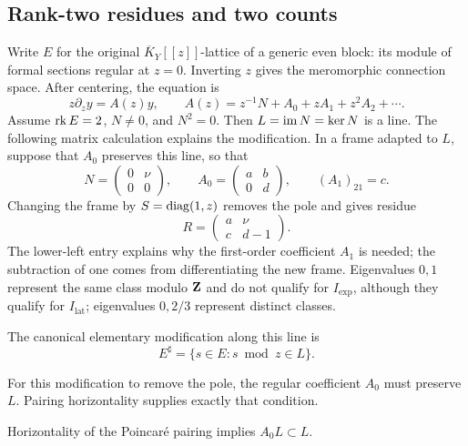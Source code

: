 \subsection{Rank-two residues and two counts}

Write \(E\) for the original \(\overline K_Y[[z]]\)-lattice of a generic
even block: its module of formal sections regular at \(z=0\). Inverting
\(z\) gives the meromorphic connection space. After centering, the equation is
\begin{equation}
 z\partial_z y=A(z)y,
 \qquad A(z)=z^{-1}N+A_0+zA_1+z^2A_2+\cdots.
 \label{eq:atomic-block-expansion}
\end{equation}
Assume \(\operatorname{rk} E=2\), \(N\ne0\), and \(N^2=0\).  Then
\(L=\operatorname{im} N=\ker N\) is a line.  The following matrix calculation explains
the modification.  In a frame adapted to \(L\), suppose that \(A_0\)
preserves this line, so that
\[
 N=\begin{pmatrix}0&\nu\\0&0\end{pmatrix},\qquad
 A_0=\begin{pmatrix}a&b\\0&d\end{pmatrix},\qquad
 (A_1)_{21}=c.
\]
Changing the frame by \(S=\operatorname{diag}(1,z)\) removes the pole and gives residue
\[
 R=\begin{pmatrix}a&\nu\\c&d-1\end{pmatrix}.
\]
The lower-left entry explains why the first-order coefficient \(A_1\)
is needed; the subtraction of one comes from differentiating the new
frame.  Eigenvalues \(0,1\) represent the same class modulo \(\mathbf Z\)
and do not qualify for \(I_{\mathrm{exp}}\), although they qualify for
\(I_{\mathrm{lat}}\); eigenvalues \(0,2/3\) represent distinct classes.

The canonical elementary modification along
this line is
\begin{equation}
 E^\sharp=\{s\in E:s\bmod z\in L\}.
 \label{eq:atomic-modification}
\end{equation}

For this modification to remove the pole, the regular coefficient \(A_0\) must
preserve \(L\).  Pairing horizontality supplies exactly that condition.

\begin{lemma}
\label{lem:A0preserve}
%
%
Horizontality of the Poincar\'e pairing implies \(A_0L\subset L\).
\end{lemma}

